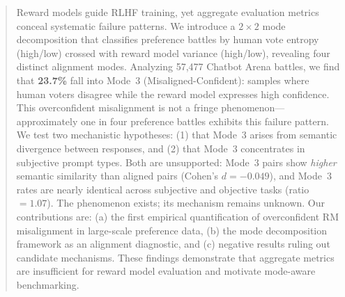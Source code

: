 \begin{abstract}
Reward models guide RLHF training, yet aggregate evaluation metrics conceal systematic failure patterns. We introduce a $2\times2$ mode decomposition that classifies preference battles by human vote entropy (high/low) crossed with reward model variance (high/low), revealing four distinct alignment modes. Analyzing 57,477 Chatbot Arena battles, we find that \textbf{23.7\%} fall into Mode~3 (Misaligned-Confident): samples where human voters disagree while the reward model expresses high confidence. This overconfident misalignment is not a fringe phenomenon---approximately one in four preference battles exhibits this failure pattern. We test two mechanistic hypotheses: (1) that Mode~3 arises from semantic divergence between responses, and (2) that Mode~3 concentrates in subjective prompt types. Both are unsupported: Mode~3 pairs show \emph{higher} semantic similarity than aligned pairs (Cohen's $d = -0.049$), and Mode~3 rates are nearly identical across subjective and objective tasks (ratio $= 1.07$). The phenomenon exists; its mechanism remains unknown. Our contributions are: (a) the first empirical quantification of overconfident RM misalignment in large-scale preference data, (b) the mode decomposition framework as an alignment diagnostic, and (c) negative results ruling out candidate mechanisms. These findings demonstrate that aggregate metrics are insufficient for reward model evaluation and motivate mode-aware benchmarking.
\end{abstract}
